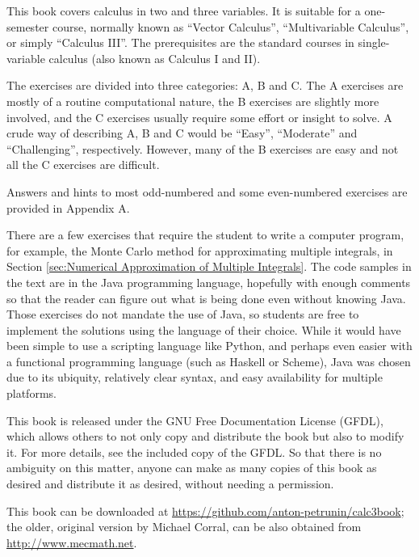 This book covers calculus in two and three variables. It is suitable for a one-semester course, normally known as
``Vector Calculus'', ``Multivariable Calculus'', or simply ``Calculus III''. 
The prerequisites are the standard courses
in single-variable calculus (also known as Calculus I and II).

The exercises are divided into three categories: A, B and C. 
The A exercises are mostly
of a routine computational nature, the B exercises are slightly more involved, and the C exercises usually require
some effort or insight to solve. 
A crude way of describing A, B and C would be ``Easy'', ``Moderate'' and ``Challenging'', respectively. 
However, many of the B exercises are easy and not all
the C exercises are difficult.

Answers and hints to most odd-numbered and some even-numbered exercises are
provided in Appendix A. 

There are a few exercises that require the student to write a computer program,
for example, the Monte Carlo method for approximating multiple integrals, in
Section \ref{sec:Numerical Approximation of Multiple Integrals}.
The code samples in the text are in the Java programming language, hopefully with enough comments so that the reader can
figure out what is being done even without knowing Java. Those exercises do not mandate the use of Java, so
students are free to implement the solutions using the language of their choice. While it would have been simple to
use a scripting language like Python, and perhaps even easier with a functional programming language (such as Haskell or Scheme), 
Java was chosen due to its ubiquity, relatively clear syntax, and easy availability for multiple platforms.

This book is released under the GNU Free Documentation License (GFDL), which allows others to not only copy and
distribute the book but also to modify it. 
For more details, see the included copy of the GFDL. So that there is no
ambiguity on this matter, anyone can make as many copies of this book as desired and distribute it as desired,
without needing a permission.

This book can be downloaded at \url{https://github.com/anton-petrunin/calc3book};
the older, original version by Michael Corral,
can be also obtained from \url{http://www.mecmath.net}. 

